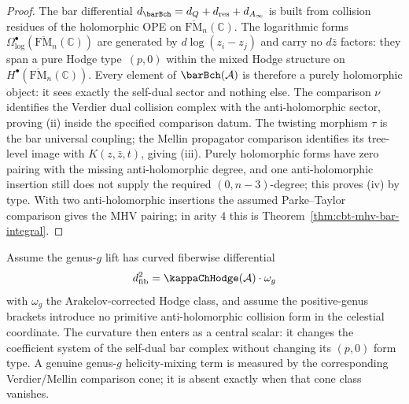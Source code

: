 \begin{proof}
The bar differential $d_{\barBch} = d_Q + d_{\mathrm{res}} + d_{A_\infty}$ is built from collision residues of the holomorphic OPE on $\overline{\mathrm{FM}}_n(\mathbb{C})$. The logarithmic forms $\Omega^\bullet_{\log}(\overline{\mathrm{FM}}_n(\mathbb{C}))$ are generated by $d\log(z_i - z_j)$ and carry no $d\bar z$ factors: they span a pure Hodge type~$(p,0)$ within the mixed Hodge structure on $H^\bullet(\overline{\mathrm{FM}}_n(\mathbb{C}))$. Every element of $\barBch(\mathcal{A})$ is therefore a purely holomorphic object: it sees exactly the self-dual sector and nothing else.
The comparison $\nu$ identifies the Verdier dual collision complex with the anti-holomorphic
sector, proving \textup{(ii)} inside the specified comparison datum. The twisting morphism
\(\tau\) is the bar universal coupling; the Mellin propagator comparison identifies its
tree-level image with \(K(z,\bar z,t)\), giving \textup{(iii)}. Purely holomorphic forms have
zero pairing with the missing anti-holomorphic degree, and one anti-holomorphic insertion still
does not supply the required \((0,n-3)\)-degree; this proves \textup{(iv)} by type. With two
anti-holomorphic insertions the assumed Parke--Taylor comparison gives the MHV pairing; in
arity \(4\) this is Theorem~\ref{thm:cbt-mhv-bar-integral}.
\end{proof}

\begin{remark}
\label{rem:ch-core-helicity-splitting-genus}
Assume the genus-$g$ lift has curved fiberwise differential
\[
d^2_{\mathrm{fib}}=\kappaChHodge(\mathcal A)\cdot\omega_g
\]
with \(\omega_g\) the Arakelov-corrected Hodge class, and assume the positive-genus brackets
introduce no primitive anti-holomorphic collision form in the celestial coordinate. The
curvature then enters as a central scalar: it changes the coefficient system of the self-dual
bar complex without changing its \((p,0)\) form type. A genuine genus-$g$ helicity-mixing term
is measured by the corresponding Verdier/Mellin comparison cone; it is absent exactly when
that cone class vanishes.
\end{remark}

